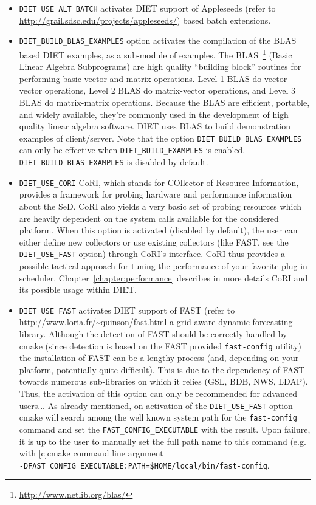 \begin{itemize}
\item
  \verb+DIET_USE_ALT_BATCH+ activates DIET support of Appleseeds (refer to
  \url{http://grail.sdsc.edu/projects/appleseeds/}) based batch
  extensions. 

\item
  \verb+DIET_BUILD_BLAS_EXAMPLES+ option activates the compilation of
  the BLAS based DIET examples, as a sub-module of examples.
  The BLAS~\footnote{\url{http://www.netlib.org/blas/}} (Basic Linear
  Algebra Subprograms) are high quality ``building block'' routines for
  performing basic vector and matrix operations.
  Level 1 BLAS do vector-vector operations, Level 2 BLAS do matrix-vector
  operations, and Level 3 BLAS do matrix-matrix operations.
  Because the BLAS are efficient, portable, and widely available,
  they're commonly used in the development of high quality linear algebra
  software.
  DIET uses BLAS to build demonstration examples of client/server.
  Note that the option \verb+DIET_BUILD_BLAS_EXAMPLES+ can only be
  effective when \verb+DIET_BUILD_EXAMPLES+ is enabled.
  \verb+DIET_BUILD_BLAS_EXAMPLES+ is disabled by default.

\item
  \verb+DIET_USE_CORI+ CoRI, which stands for COllector of Resource
  Information, provides a framework for probing hardware and performance
  information about the SeD.
  CoRI also yields a very basic set of probing resources which are
  heavily dependent on the system calls available for the considered platform.
  When this option is activated (disabled by default), the user can either
  define new collectors or use existing collectors (like FAST, see the
  \verb+DIET_USE_FAST+ option) through CoRI's interface.
  CoRI thus provides a possible tactical approach for tuning the performance
  of your favorite plug-in scheduler.
  Chapter~\ref{chapter:performance} describes in more details CoRI and its
  possible usage within DIET.

\item
  \verb+DIET_USE_FAST+ activates DIET support of FAST (refer to
  \url{http://www.loria.fr/~quinson/fast.html} a grid aware dynamic
  forecasting library.
  Although the detection of FAST should be correctly handled by cmake
  (since detection is based on the FAST provided \verb+fast-config+ utility)
  the installation of FAST can be a lengthy process (and, depending on your
  platform, potentially quite difficult).
  This is due to the dependency of FAST towards numerous sub-libraries on
  which it relies (GSL, BDB, NWS, LDAP).
  Thus, the activation of this option can only be recommended for advanced
  users...
  As already mentioned, on activation of the \verb+DIET_USE_FAST+ option
  cmake will search among the well known system path for the
  \verb+fast-config+ command and set the \verb+FAST_CONFIG_EXECUTABLE+ 
  with the result. Upon failure, it is up to the user to manually set the
  full path name to this command (e.g. with [c]cmake command line argument \\
  \verb+-DFAST_CONFIG_EXECUTABLE:PATH=$HOME/local/bin/fast-config+.


\end{itemize}
